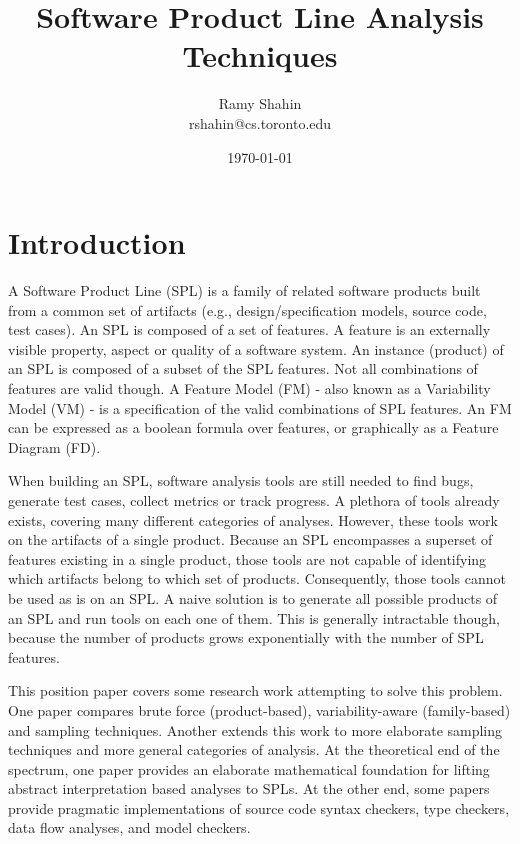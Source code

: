 \documentclass[11pt]{article}
\title{Software Product Line Analysis Techniques}
\author{Ramy Shahin \\ rshahin@cs.toronto.edu}
\date{\today}                                           %
\begin{document}
\maketitle


\section{Introduction}
A Software Product Line (SPL) is a family of related software products built from a common set of artifacts (e.g., design/specification models, source code, test cases). An SPL is composed of a set of features. A feature is an externally visible property, aspect or quality of a software system. An instance (product) of an SPL is composed of a subset of the SPL features. Not all combinations of features are valid though. A Feature Model (FM) - also known as a Variability Model (VM) - is a specification of the valid combinations of SPL features. An FM can be expressed as a boolean formula over features, or graphically as a Feature Diagram (FD).

When building an SPL, software analysis tools are still needed to find bugs, generate test cases, collect metrics or track progress. A plethora of tools already exists, covering many different categories of analyses. However, these tools work on the artifacts of a single product. Because an SPL encompasses a superset of features existing in a single product, those tools are not capable of identifying which artifacts belong to which set of products. Consequently, those tools cannot be used as is on an SPL. A naive solution is to generate all possible products of an SPL and run tools on each one of them. This is generally intractable though, because the number of products grows exponentially with the number of SPL features.

This position paper covers some research work attempting to solve this problem. One paper compares brute force (product-based), variability-aware (family-based) and sampling techniques\cite{Apel:2013}. Another extends this work to more elaborate sampling techniques and more general categories of analysis\cite{Liebig:2013}. At the theoretical end of the spectrum, one paper provides an elaborate mathematical foundation for lifting abstract interpretation based analyses to SPLs\cite{Midtgaard:2015}. At the other end, some papers provide pragmatic implementations of source code syntax checkers\cite{Gazzillo:2012}, type checkers\cite{Kastner:2012}, data flow analyses\cite{Bodden:2013}, and model checkers\cite{Classen:2013}.
\end{document}
